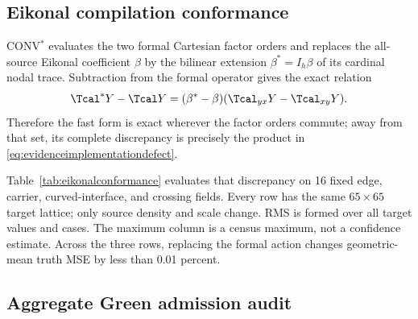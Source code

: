 \subsection{Eikonal compilation conformance}

CONV$^{*}$ evaluates the two formal Cartesian factor orders and replaces the
all-source Eikonal coefficient \(\beta\) by the bilinear extension
\(\beta^*=I_h\beta\) of its cardinal nodal trace. Subtraction from the formal
operator gives the exact relation
\begin{equation}
 \Tcal^*Y-\Tcal Y
 = (\beta^*-\beta)(\Tcal_{yx}Y-\Tcal_{xy}Y).
 \label{eq:evidenceimplementationdefect}
\end{equation}
Therefore the fast form is exact wherever the factor orders commute; away
from that set, its complete discrepancy is precisely the product in
\eqref{eq:evidenceimplementationdefect}.

Table~\ref{tab:eikonalconformance} evaluates that discrepancy on 16 fixed
edge, carrier, curved-interface, and crossing fields. Every row has the same
$65\times65$ target lattice; only source density and scale change. RMS is
formed over all target values and cases. The maximum column is a census
maximum, not a confidence estimate. Across the three rows, replacing the
formal action changes geometric-mean truth MSE by less than 0.01 percent.

\begin{table}[H]
\caption{CONV$^{*}$ conformance to formal Eikonal CONV at target side 65}
\label{tab:eikonalconformance}
\centering
\scriptsize
\setlength{\tabcolsep}{2.5pt}
\end{table}

\subsection{Aggregate Green admission audit}

